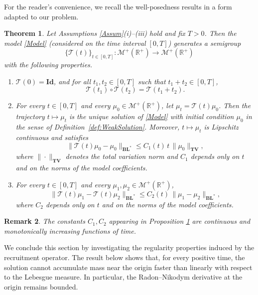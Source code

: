 \documentclass[12pt,a4paper]{amsart}
\newtheorem{theorem}{Theorem}[section]
\newtheorem{remark}[theorem]{Remark}
\newcommand{\BLN}{\mathbf{BL}}
\newcommand{\TV}{\mathbf{TV}}
\begin{document}
\noindent
For the reader's convenience, we recall the well-posedness results in a form adapted to our problem.

\begin{theorem} \label{existenceAgnieszka}
Let Assumptions \ref{Assum}(i)--(iii) hold and fix $T>0$. Then the model \eqref{Model} (considered on the time interval $[0,T]$) generates a semigroup
\[
\{\mathcal{T}(t)\}_{t\in[0,T]}:\mathcal{M}^+(\mathbb{R}^+)\to\mathcal{M}^+(\mathbb{R}^+)
\]
with the following properties.
\begin{enumerate}
\item $\mathcal{T}(0)=\mathbf{Id}$, and for all $t_1,t_2\in[0,T]$ such that $t_1+t_2\in[0,T]$,
\[
\mathcal{T}(t_1)\circ\mathcal{T}(t_2)=\mathcal{T}(t_1+t_2).
\]

\item For every $t\in[0,T]$ and every $\mu_0\in\mathcal{M}^+(\mathbb{R}^+)$, let
$\mu_t=\mathcal{T}(t)\mu_0$. Then the trajectory
$t\mapsto\mu_t$ is the unique solution of \eqref{Model} with initial condition $\mu_0$ in the sense of Definition~\ref{def:WeakSolution}. Moreover, $t\mapsto\mu_t$ is Lipschitz continuous and satisfies
\[
\|\mathcal{T}(t)\mu_0-\mu_0\|_{\BLN^*}
\le C_1(t)\,t\,\|\mu_0\|_{\TV},
\]
where $\|\cdot\|_{\TV}$ denotes the total variation norm and $C_1$ depends only on $t$ and on the norms of the model coefficients.

\item For every $t\in[0,T]$ and every $\mu_1,\mu_2\in\mathcal{M}^+(\mathbb{R}^+)$,
\[
\|\mathcal{T}(t)\mu_1-\mathcal{T}(t)\mu_2\|_{\BLN^*}
\le
C_2(t)\,
\|\mu_1-\mu_2\|_{\BLN^*},
\]
where $C_2$ depends only on $t$ and on the norms of the model coefficients.
\end{enumerate}
\end{theorem}

\begin{remark}
The constants $C_1,C_2$ appearing in Proposition \ref{existenceAgnieszka} are continuous and monotonically increasing functions of time.
\end{remark}

\noindent We conclude this section by investigating the regularity properties induced by the recruitment operator. The result below shows that, for every positive time, the solution cannot accumulate mass near the origin faster than linearly with respect to the Lebesgue measure. In particular, the Radon--Nikodym derivative at the origin remains bounded. 
\end{document}
